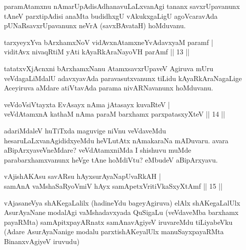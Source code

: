 \begin{artha}
paramAtamxnu nAmarUpAdisAdhanavuLaLxvanAgi tananx savxrUpavanunx 
tAneV parxtipAdisi anaMta budidhxgU vAkukxgaLigU agoVcaravAda 
pUNaRsavxrUpavanunx neVrA (savxBAvataH) hoMduvanu.
\end{artha}

\begin{shl}
tarxyeyxYva bArxhamxNoV vidAvxnAtamxneYvAdavxyaM paramf | \\
viditAvx nivaqRtiM yAti kAyaRkAraNayoVH parAmf \hfill||  13 ||  
\end{shl}

\begin{artha}
tatatxvXjAcnxni bArxhamxNanu AtamxsavxrUpaveV Agiruva mUru 
veVdagaLiMdalU adavxyavAda paravasutxvanunx tiLidu kAyaRkAraNagaLige 
Aceyiruva aMdare atiVtavAda parama nivARNavanunx hoMduvanu.
\end{artha}


\begin{shl}
veVdoV\s siVtayxta EvAsayx nAma jAtasayx kuvaRteV | \\
veVdAtamxnA kathaM nAma paraM barxhamx parxpatasxyXteV \hfill||  14 ||  
\end{shl}

\begin{artha}
adariMdaleV huTiTxda maguvige niVnu veVdaveMdu 
hesaruLaLxvanAgididxyeMdu heVLutAtx nAmakaraNa mADuvaru. avara 
aBipArxyaveVneMdare? veVdAtamxniMda I shishuvu muMde 
parabarxhamxvanunx heVge tAne hoMdiVtu? eMbudeV aBipArxyavu.
\end{artha}


\begin{shl}
vAjishAKAsu savARsu hAyxsurAyaNapUvaRkAH | \\
samAnA vaMshaSaRyoV\s miV hAyx samApetxVritiVkaSxyXtAmf \hfill||  15 ||  
\end{shl}

\begin{artha}
vAjasaneVya shAKegaLalilx (hadineYdu bageyAgiruva) elAlx shAKegaLalUlx \-AsurAyaNane modalAgi vaMshadavxyada QuSigaLu (veVdaveMba barxhamx payaRMta) samApitxpayARnatx samAnavAgiyeV iruvareMdu tiLiyabeVku (Adare AsurA\-yaNanige modalu parxtishAKeyalUlx manuSayxpayaRMta BinanxvAgiyeV iruvudu)
\end{artha}

